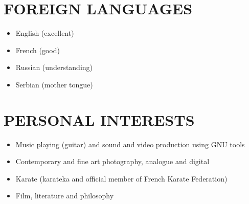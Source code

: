 \documentclass[a4paper, oneside, final]{scrartcl}
\begin{document}
\section{FOREIGN LANGUAGES}
\begin{itemize}
   \item English (excellent)
   \item French (good)
   \item Russian (understanding)
   \item Serbian (mother tongue)
\end{itemize}


\section{PERSONAL INTERESTS}
\begin{itemize}
   \item Music playing (guitar) and sound and video production using GNU
            tools
   \item Contemporary and fine art photography, analogue and digital 
   \item Karate (karateka and official member of French Karate Federation)
   \item Film, literature and philosophy
\end{itemize}
\end{document}
